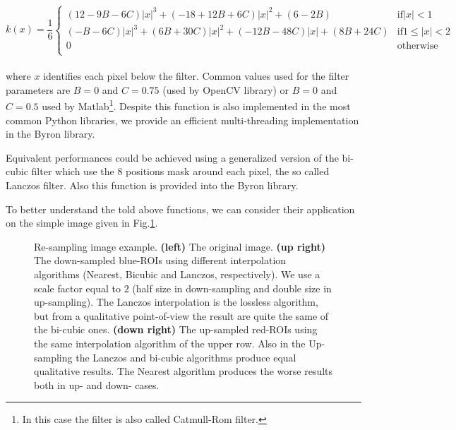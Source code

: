 \documentclass{standalone}
\begin{document}
\begin{equation}
k(x) = \frac{1}{6} \left\{ \begin{array}{rc}
  (12 - 9B - 6C) |x|^3 + (-18 + 12B + 6C) |x|^2 + (6 - 2B)           & \mbox{if}        |x| < 1 \\
  (−B − 6C) |x|^3 + (6B + 30C) |x|^2 + (−12B − 48C) |x| + (8B + 24C) & \mbox{if} 1 \leq |x| < 2 \\
  0                                                                  & \mbox{otherwise}         \\
  \end{array}
  \right.
\end{equation}
\\
where $x$ identifies each pixel below the filter.
Common values used for the filter parameters are $B=0$ and $C=0.75$ (used by \textsf{OpenCV} library) or $B=0$ and $C=0.5$ used by \textsf{Matlab}\footnote{
  In this case the filter is also called Catmull-Rom filter.
}.
Despite this function is also implemented in the most common \textsf{Python} libraries, we provide an efficient multi-threading implementation in the \textsf{Byron} library.

Equivalent performances could be achieved using a generalized version of the bi-cubic filter which use the $8$ positions mask around each pixel, the so called Lanczos filter.
Also this function is provided into the \textsf{Byron} library.

To better understand the told above functions, we can consider their application on the simple image given in Fig.\ref{fig:resampling}.

\begin{figure}[htbp]
\centering
\def\svgwidth{\textwidth}

\caption{Re-sampling image example.
\textbf{(left)} The original image.
\textbf{(up right)} The down-sampled blue-ROIs using different interpolation algorithms (Nearest, Bicubic and Lanczos, respectively).
We use a scale factor equal to $2$ (half size in down-sampling and double size in up-sampling).
The Lanczos interpolation is the lossless algorithm, but from a qualitative point-of-view the result are quite the same of the bi-cubic ones.
\textbf{(down right)} The up-sampled red-ROIs using the same interpolation algorithm of the upper row.
Also in the Up-sampling the Lanczos and bi-cubic algorithms produce equal qualitative results.
The Nearest algorithm produces the worse results both in up- and down- cases.
}
\label{fig:resampling}
\end{figure}
\end{document}

